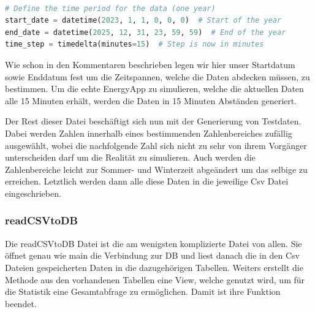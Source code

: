 \documentclass[11pt]{scrartcl}
\begin{document}
\begin{lstlisting}[language=Python]

# Define the time period for the data (one year)
start_date = datetime(2023, 1, 1, 0, 0, 0)  # Start of the year
end_date = datetime(2025, 12, 31, 23, 59, 59)  # End of the year
time_step = timedelta(minutes=15)  # Step is now in minutes

\end{lstlisting}

Wie schon in den Kommentaren beschrieben legen wir hier unser Startdatum sowie Enddatum fest um die Zeitspannen, welche die Daten abdecken müssen, zu bestimmen. Um die echte EnergyApp zu simulieren, welche die aktuellen Daten alle 15 Minuten erhält, werden die Daten in 15 Minuten Abständen generiert.

Der Rest dieser Datei beschäftigt sich nun mit der Generierung von Testdaten. Dabei werden Zahlen innerhalb eines bestimmenden Zahlenbereiches zufällig ausgewählt, wobei die nachfolgende Zahl sich nicht zu sehr von ihrem Vorgänger unterscheiden darf um die Realität zu simulieren. Auch werden die Zahlenbereiche leicht zur Sommer- und Winterzeit abgeändert um das selbige zu erreichen. Letztlich werden dann alle diese Daten in die jeweilige Csv Datei eingeschrieben.

\subsubsection*{readCSVtoDB} 

Die readCSVtoDB Datei ist die am wenigsten komplizierte Datei von allen. Sie öffnet genau wie main die Verbindung zur DB und liest danach die in den Csv Dateien gespeicherten Daten in die dazugehörigen Tabellen. 
Weiters erstellt die Methode aus den vorhandenen Tabellen eine View, welche genutzt wird, um für die Statistik eine Gesamtabfrage zu ermöglichen. Damit ist ihre Funktion beendet.

\newpage
\end{document}
